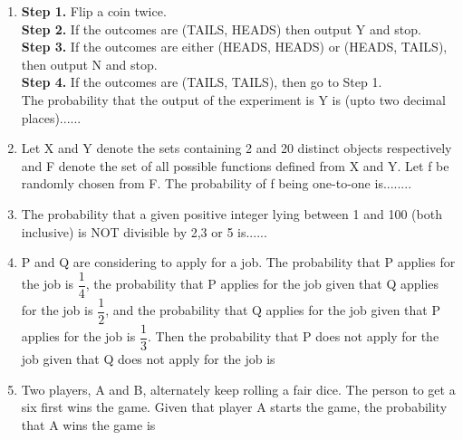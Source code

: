 \documentclass[journal,12pt,twocolumn]{IEEEtran}
\begin{document}
\begin{enumerate}
\item \textbf{Step 1.} Flip a coin twice.\\
\textbf{Step 2.} If the outcomes are (TAILS, HEADS) then output Y and stop.\\
\textbf{Step 3.} If the outcomes are either (HEADS, HEADS) or (HEADS, TAILS), then output N and stop.\\
\textbf{Step 4.} If the outcomes are (TAILS, TAILS), then go to Step 1.\\
The probability that the output of the experiment is Y is (upto two decimal places)......
%
\solution



\item Let X and Y denote the sets containing 2 and 20 distinct objects respectively and F denote the set of all possible functions defined from X and Y. Let f be randomly chosen from F. The probability of f being one-to-one is........

\item The probability that a given positive integer lying between 1 and 100 (both inclusive) is NOT divisible by 2,3 or 5 is......
\\
\solution


\item P and Q are considering to apply for a job. The probability that P applies for the job is $\dfrac{1}{4}$, the probability that P applies for the job given that Q applies for the job is $\dfrac{1}{2}$, and the probability that Q applies for the job given that P applies for the job is $\dfrac{1}{3}$. Then the probability that P does not apply for the job given that Q does not apply for the job is 

\begin{enumerate}
\end{enumerate}
\solution


\item Two players, A and B, alternately keep rolling a fair dice. The person to get a six first wins the game. Given that player A starts the game, the probability that A wins the game is


\end{enumerate}
\end{document}
